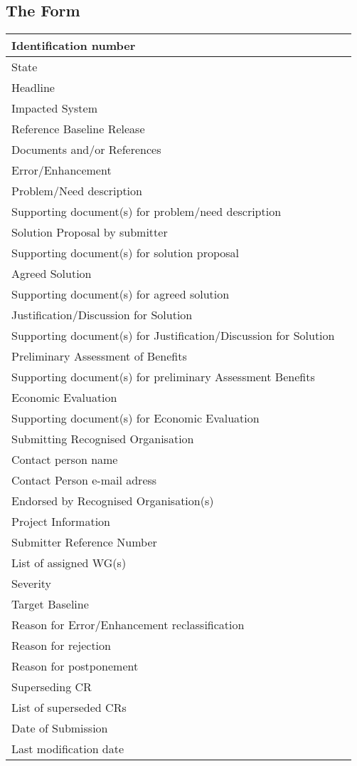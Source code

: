 \documentclass{template/openetcs_article}
\begin{document}
\subsection{The Form}

\begin{supertabular}{| m{4cm} |  m{10cm} |}
Identification number & \\\hline
State &  \\\hline
Headline & \\\hline
Impacted System & \\\hline
Reference Baseline Release & \\\hline
Documents and/or References  & \\\hline
Error/Enhancement & \\\hline
Problem/Need description & \\\hline
Supporting document(s) for problem/need description & \\\hline
Solution Proposal by submitter& \\\hline
Supporting document(s) for solution proposal & \\\hline
Agreed Solution & \\\hline
Supporting document(s) for agreed solution & \\\hline
Justification/Discussion for Solution & \\\hline
Supporting document(s) for Justification/Discussion for Solution & \\\hline
Preliminary Assessment of Benefits & \\\hline
Supporting document(s) for preliminary Assessment Benefits & \\\hline
Economic Evaluation & \\\hline
Supporting document(s) for Economic Evaluation & \\\hline
Submitting Recognised Organisation & \\\hline
Contact person name & \\\hline
Contact Person e-mail adress & \\\hline
Endorsed by Recognised Organisation(s) & \\\hline
Project Information & \\\hline
Submitter Reference Number  & \\\hline
List of assigned WG(s) & \\\hline
Severity & \\\hline
Target Baseline  & \\\hline
Reason for Error/Enhancement reclassification & \\\hline
Reason for rejection & \\\hline
Reason for postponement & \\\hline
Superseding CR & \\\hline
List of superseded CRs & \\\hline
Date of Submission & \\\hline
Last modification date & \\\hline
\end{supertabular}
\end{document}
